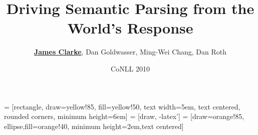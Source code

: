  = [rectangle, draw=yellow!85, fill=yellow!50,
text width=5em, text centered, rounded corners, minimum height=6em]
 = [draw, -latex']
 = [draw=orange!85, ellipse,fill=orange!40,
minimum height=2em,text centered]



\title[] %
{Driving Semantic Parsing from the World's Response}


\author[Clarke, Goldwasser, Chang, Roth] %
{\textbf{\underline{James Clarke}}, Dan Goldwasser, Ming-Wei Chang, Dan Roth}


\date[] %
{CoNLL 2010}

\subject{Talks}










